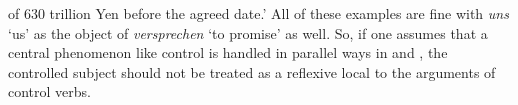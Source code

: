 \documentclass[output=paper
	        ,collection
	        ,collectionchapter
 	        ,biblatex
                ,babelshorthands
                ,newtxmath
                ,draftmode
                ,colorlinks, citecolor=brown
]{langscibook}
\begin{document}
of 630 trillion Yen before the agreed date.'
%
\zl
All of these examples are fine with \emph{uns} `us' as the object of \emph{versprechen} `to promise'
as well. So, if one assumes that a central phenomenon like control is handled in parallel ways in 
and , the controlled subject should not be treated as a reflexive local to the arguments of
control verbs.

\end{document}
